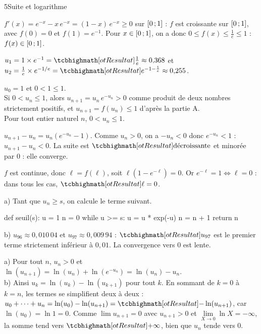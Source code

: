 \begin{corrigeBac}{5}{Suite et logarithme}
\begin{questions}
  \item $f'(x)=e^{-x}-x\,e^{-x}=(1-x)\,e^{-x}\geq0$ sur $\mathopen{[}0\,{;}\,1\mathclose{]}$ : $f$ est croissante sur $\mathopen{[}0\,{;}\,1\mathclose{]}$, avec $f(0)=0$ et $f(1)=e^{-1}$.
    Pour $x\in\mathopen{[}0\,{;}\,1\mathclose{]}$, on a donc $0\leq f(x)\leq\frac1e\leq1$ : $f(x)\in\mathopen{[}0\,{;}\,1\mathclose{]}$. 
\end{questions}
\begin{questions}[resume]
  \item $u_1=1\times e^{-1}=\res{\tfrac1e}\approx0{,}368$ et $u_2=\frac1e\times e^{-1/e}=\res{e^{-1-\frac1e}}\approx0{,}255$. 
  \item {} $u_0=1$ et $0<1\leq1$.\\
     Si $0<u_n\leq1$, alors $u_{n+1}=u_n\,e^{-u_n}>0$ comme produit de deux nombres strictement positifs, et
    $u_{n+1}=f(u_n)\leq1$ d'après la partie A.\\
     Pour tout entier naturel $n$, $0<u_n\leq1$. 
  \item $u_{n+1}-u_n=u_n\left(e^{-u_n}-1\right)$. Comme $u_n>0$, on a $-u_n<0$ donc $e^{-u_n}<1$ : $u_{n+1}-u_n<0$. La suite est
    $\res{\text{décroissante}}$ et minorée par $0$ : elle converge. 
  \item $f$ est continue, donc $\ell=f(\ell)$, soit $\ell\left(1-e^{-\ell}\right)=0$. Or $e^{-\ell}=1\iff\ell=0$ : dans tous les cas,
    $\res{\ell=0}$. 
  \item a) Tant que $u_n\geq s$, on calcule le terme suivant.
\begin{codecote}[0.46]
\begin{pythoncol}
def seuil(s):
    u = 1
    n = 0
    while u >= s:
        u = u * exp(-u)
        n = n + 1
    return n
\end{pythoncol}
\cote
b) $u_{96}\approx0{,}010\,04$ et $u_{97}\approx0{,}009\,94$ : $\res{u_{97}}$ est le premier terme strictement inférieur à $0{,}01$. La
convergence vers $0$ est lente.
\end{codecote}
  \item a) Pour tout $n$, $u_n>0$ et $\ln(u_{n+1})=\ln(u_n)+\ln\left(e^{-u_n}\right)=\ln(u_n)-u_n$.\\
    b) Ainsi $u_k=\ln(u_k)-\ln(u_{k+1})$ pour tout $k$. En sommant de $k=0$ à $k=n$, les termes se simplifient deux à deux :
    $u_0+\dots+u_n=\ln(u_0)-\ln(u_{n+1})=\res{-\ln(u_{n+1})}$, car $\ln(u_0)=\ln1=0$. Comme $\lim u_{n+1}=0$ avec $u_{n+1}>0$ et
    $\lim\limits_{X\to0}\ln X=-\infty$, la somme tend vers $\res{+\infty}$, bien que $u_n$ tende vers $0$. \pts{1 pt}
\end{questions}
\end{corrigeBac}

